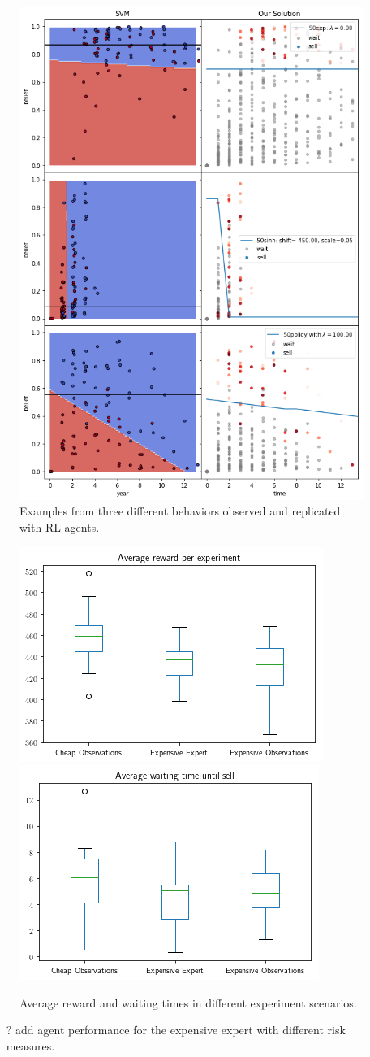 \begin{figure}
    \includegraphics[width=0.8\linewidth]{img/fit.png}
\caption{Examples from three different behaviors observed and replicated with RL agents.}
\end{figure}


\begin{figure}
\includegraphics[width=0.45\linewidth]{img/avg_reward.png}
\includegraphics[width=0.45\linewidth]{img/avg_waiting.png}
\caption{Average reward and waiting times in different experiment scenarios.}
\end{figure}

\begin{itemize}
    \item[?] add agent performance for the expensive expert with different risk measures.
\end{itemize}
